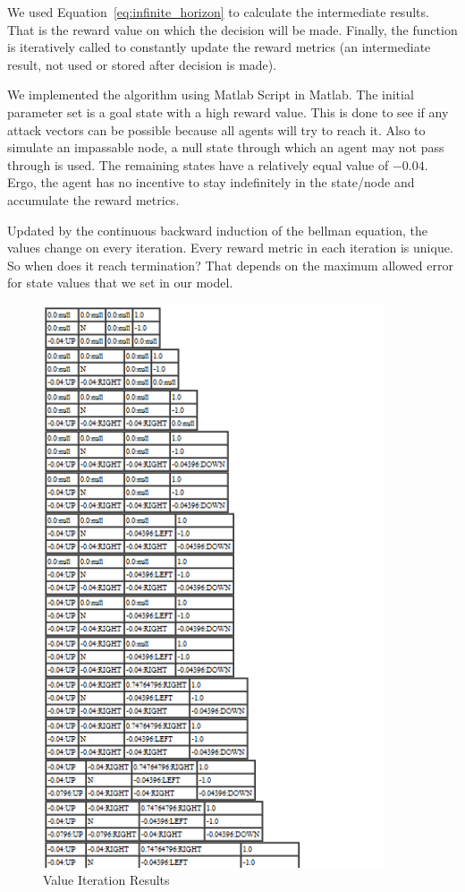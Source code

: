 We used Equation~\ref{eq:infinite_horizon} to calculate the intermediate
results. That is the
reward value on which the decision will be made. Finally, the function is iteratively called to constantly update the reward
metrics (an intermediate result, not used or stored after decision is made).

We implemented the algorithm using Matlab Script in Matlab. The
initial parameter set is a goal state with a high
reward value. This is done to see if any attack vectors can be possible because
all agents will try to reach it. Also to simulate an impassable node, a null
state through which an agent may not pass through is used. The
remaining states have a relatively equal value of \(-0.04\). Ergo, the agent
has no incentive to stay indefinitely in the state/node and accumulate the
reward metrics.

Updated by the continuous backward induction of the bellman equation,
the values change on every iteration. Every reward metric in
each iteration is unique. So when does it reach termination? That depends on the
maximum allowed error for state values that we set in our model. 
\FloatBarrier 
\begin{figure}[h!]
    \begin{center}
        \includegraphics[width=0.90\textwidth]{Figures/Planning_Figure_2.png}
        \caption{Value Iteration Results}
        \label{fig:ValueIterationResults}
    \end{center}
\end{figure}

